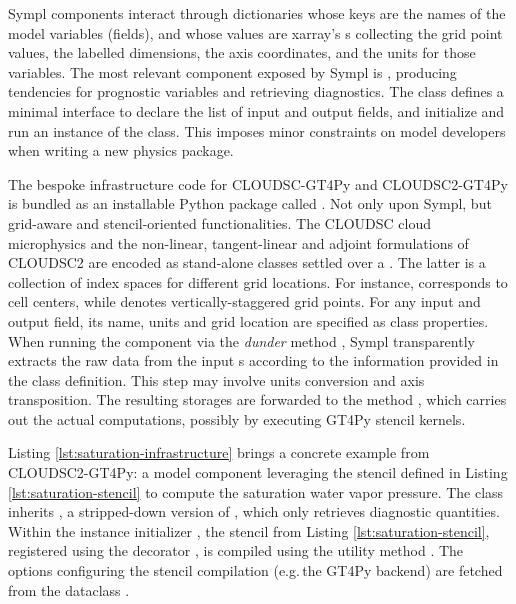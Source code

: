\documentclass[main.tex]{subfiles}
\begin{document}
        Sympl components interact through dictionaries whose keys are the names of the model variables (fields), and whose values are xarray's s \citep{hoyer17} collecting the grid point values, the labelled dimensions, the axis coordinates, and the units for those variables. The most relevant component exposed by Sympl is , producing tendencies for prognostic variables and retrieving diagnostics. The class defines a minimal interface to declare the list of input and output fields, and initialize and run an instance of the class. This imposes minor constraints on model developers when writing a new physics package.

        The bespoke infrastructure code for CLOUDSC-GT4Py and CLOUDSC2-GT4Py is bundled as an installable Python package called . Not only  upon Sympl, but  grid-aware and stencil-oriented functionalities. The CLOUDSC cloud microphysics and the non-linear, tangent-linear and adjoint formulations of CLOUDSC2 are encoded as stand-alone  classes settled over a . The latter is a collection of index spaces for different grid locations. For instance,  corresponds to cell centers, while  denotes vertically-staggered grid points. For any input and output field, its name, units and grid location are specified as class properties. When running the component via the \emph{dunder} method , Sympl transparently extracts the raw data from the input s according to the information provided in the class definition. This step may involve units conversion and axis transposition. The resulting storages are forwarded to the method , which carries out the actual computations, possibly by executing GT4Py stencil kernels.

        Listing \ref{lst:saturation-infrastructure} brings a concrete example from CLOUDSC2-GT4Py: a model component leveraging the stencil defined in Listing \ref{lst:saturation-stencil} to compute the saturation water vapor pressure. The class inherits , a stripped-down version of , which only retrieves diagnostic quantities. Within the instance initializer , the stencil from Listing \ref{lst:saturation-stencil}, registered using the decorator , is compiled using the utility method . The options configuring the stencil compilation (e.g.\,the GT4Py backend) are fetched from the dataclass .

\end{document}
